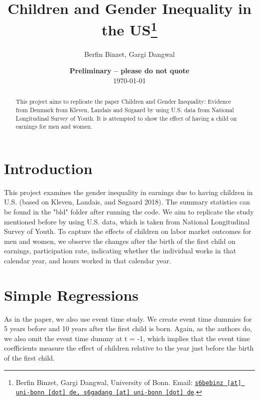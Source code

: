 \documentclass[11pt, a4paper, leqno]{article}
\begin{document}
\title{Children and Gender Inequality in the US\thanks{Berfin Binzet, Gargi Dangwal, University of Bonn. Email: \href{mailto:s6bebinz@uni-bonn.de, s6gadang@uni-bonn.de}{\nolinkurl{s6bebinz [at] uni-bonn [dot] de, s6gadang [at] uni-bonn [dot] de}}.}}

\author{Berfin Binzet, Gargi Dangwal}

\date{
    {\bf Preliminary -- please do not quote}
    \\[1ex]
    \today
}

\maketitle

\begin{abstract}
 This project aims to replicate the paper Children and Gender Inequality: Evidence from Denmark from Kleven, Landais and Søgaard by using U.S. data from National Longitudinal Survey of Youth. It is attempted to show the effect of having a child on earnings for men and women. 
\end{abstract}
\clearpage

\section{Introduction} 
This project examines the gender inequality in earnings due to having children in U.S. (based on Kleven, Landais, and Søgaard 2018). The summary statistics can be found in the "bld" folder after running the code. We aim to replicate the study mentioned before by using U.S. data, which is taken from National Longitudinal Survey of Youth. To capture the effects of children on labor market outcomes for men and women, we observe the changes after the birth of the first child on earnings, participation rate, indicating whether the individual works in that calendar year, and hours worked in that calendar year. 

\section*{Simple Regressions}
As in the paper, we also use event time study. We create event time dummies for 5 years before and 10 years after the first child is born. Again, as the authors do, we also omit the event time dummy at t = -1, which implies that the event time coefficients measure the effect of children relative to the year just before the birth of the first child. 
\end{document}

